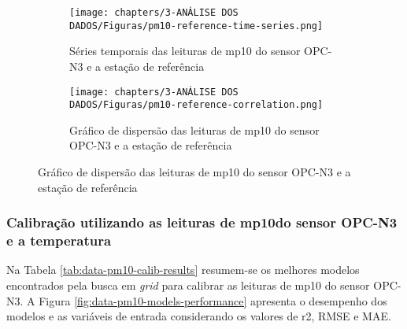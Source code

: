 \begin{figure}[h]
    \centering
    \caption{Séries temporais e gráficos de dispersão das medições de \acrshort{mp10}}
    \begin{subfigure}{0.495\textwidth}
        \texttt{[image: chapters/3-ANÁLISE DOS DADOS/Figuras/pm10-reference-time-series.png]}
        \caption{Séries temporais das leituras de \acrshort{mp10} do sensor OPC-N3 e a estação de referência}
        \label{fig:data-pm10-reference-time-series}
    \end{subfigure}
    \hfill
    \begin{subfigure}{0.495\textwidth}
        \texttt{[image: chapters/3-ANÁLISE DOS DADOS/Figuras/pm10-reference-correlation.png]}
        \caption{Gráfico de dispersão das leituras de \acrshort{mp10} do sensor OPC-N3 e a estação de referência}
        \label{fig:data-pm10-reference-corr}
    \end{subfigure}
\end{figure}

\subsubsection{Calibração utilizando as leituras de \acrshort{mp10}do sensor OPC-N3 e a temperatura}

Na Tabela \ref{tab:data-pm10-calib-results} resumem-se os melhores modelos encontrados pela busca em \textit{grid} para calibrar as leituras de \acrshort{mp10} do sensor OPC-N3. A Figura \ref{fig:data-pm10-models-performance} apresenta o desempenho dos modelos e as variáveis de entrada considerando os valores de r2, RMSE e MAE.


